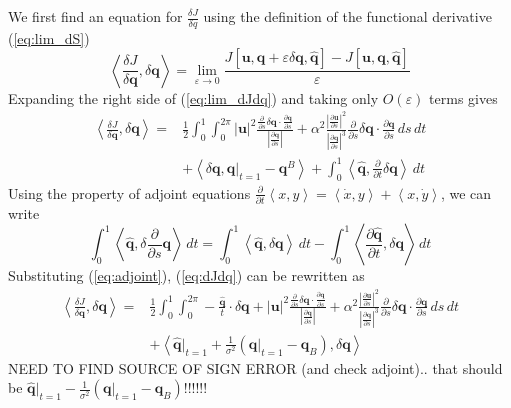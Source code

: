 \documentclass[a4paper, 12pt]{article}
\newcommand{\eq}[1]{(\ref{eq:#1})}
\newcommand{\vect}[1]{\ensuremath{\mathbf{#1}}}
\newcommand{\hvect}[1]{\ensuremath{\hat{\vect{#1}}}}
\newcommand{\pp}[2]{\frac{\partial #1}{\partial #2}}
\newcommand{\vv}[2]{\frac{\delta #1}{\delta #2}}
\newcommand{\angles}[1]{\left\langle #1 \right\rangle}
\newcommand{\eps}{\varepsilon}
\begin{document}
We first find an equation for  $\vv{J}{q}$ using the definition of the functional derivative \eq{lim_dS}
\begin{equation}
  \label{eq:lim_dJdq}
  \left\langle \vv{J}{\vect q}, \delta \vect q \right\rangle =
  \lim_{\eps \rightarrow 0} \frac{J[\vect u, \vect q + \eps \delta \vect q, \hvect q] - J[\vect u, \vect q, \hvect q]}{\eps}
\end{equation}
Expanding the right side of \eq{lim_dJdq} and taking only $O(\eps)$ terms gives
\begin{align}
  \label{eq:dJdq}
  \left\langle \vv{J}{\vect q}, \delta \vect q \right\rangle =&
  \frac{1}{2}\int^1_0\int^{2\pi}_0 |\vect u|^2
  \frac{\pp{}{s}\delta \vect q \cdot \pp{\vect q}{s}}{|\pp{\vect q}{s}|}
    + \alpha^2 \frac{|\pp{\vect u}{s}|^2}{|\pp{\vect q}{s}|^3} \pp{}{s}\delta \vect q \cdot \pp{\vect q}{s} \,ds\,dt  \nonumber \\
    &+ \left\langle \delta \vect q, \vect q\big|_{t=1} - \vect q^B \right\rangle + \int^1_0\left\langle \hvect q, \pp{}{t} \delta \vect q \right\rangle\,dt
\end{align}
Using the property of adjoint equations $\pp{}{t}\angles{x,y} = \angles{\dot x, y} + \angles{x, \dot y}$, we can write
\begin{equation}
  \label{eq:adjoint}
  \int^1_0\angles{\hvect q, \delta \pp{}{s} \vect q}\,dt =  \int^1_0\angles{\hvect q, \delta \vect q}\,dt -  \int^1_0\angles{\pp{\hvect q}{t}, \delta \vect q }\,dt
\end{equation}
Substituting \eq{adjoint}, \eq{dJdq} can be rewritten as
\begin{align}
  \label{eq:dJdq-adjoint}
  \left\langle \vv{J}{\vect q}, \delta \vect q \right\rangle =&
  \frac{1}{2}\int^1_0\int^{2\pi}_0 -\frac{\hvect q}{t}\cdot \delta \vect q + |\vect u|^2
  \frac{\pp{}{s}\delta \vect q \cdot \pp{\vect q}{s}}{|\pp{\vect q}{s}|}
    + \alpha^2 \frac{|\pp{\vect u}{s}|^2}{|\pp{\vect q}{s}|^3} \pp{}{s}\delta \vect q \cdot \pp{\vect q}{s} \,ds\,dt  \nonumber \\
    &+ \angles{ \hvect q \big|_{t=1} + \frac{1}{\sigma^2}(\vect q \big|_{t=1} - \vect q_B), \delta \vect q}
\end{align}
NEED TO FIND SOURCE OF SIGN ERROR (and check adjoint).. that should be $\hvect q |_{t=1} - \frac{1}{\sigma^2}(\vect q \big|_{t=1} - \vect q_B)$!!!!!!
\end{document}
